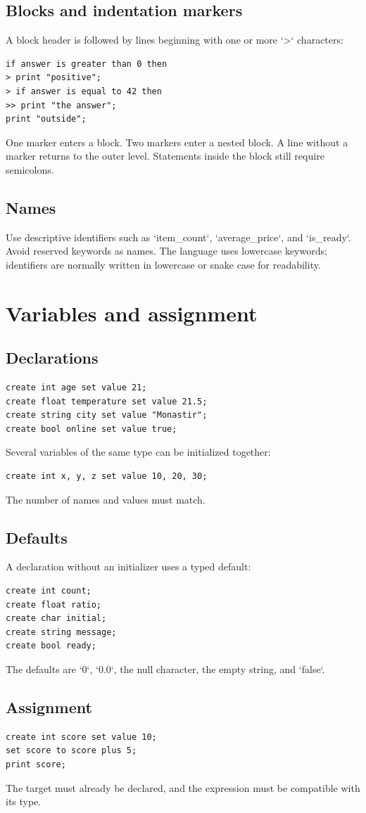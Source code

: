 \documentclass[10.5pt,a4paper]{article}
\begin{document}
\subsection{Blocks and indentation markers}
A block header is followed by lines beginning with one or more `>` characters:
\begin{lstlisting}
if answer is greater than 0 then
> print "positive";
> if answer is equal to 42 then
>> print "the answer";
print "outside";
\end{lstlisting}
One marker enters a block. Two markers enter a nested block. A line without a marker returns to the outer level. Statements inside the block still require semicolons.
\subsection{Names}
Use descriptive identifiers such as `item_count`, `average_price`, and `is_ready`. Avoid reserved keywords as names. The language uses lowercase keywords; identifiers are normally written in lowercase or snake case for readability.
\section{Variables and assignment}
\subsection{Declarations}
\begin{lstlisting}
create int age set value 21;
create float temperature set value 21.5;
create string city set value "Monastir";
create bool online set value true;
\end{lstlisting}
Several variables of the same type can be initialized together:
\begin{lstlisting}
create int x, y, z set value 10, 20, 30;
\end{lstlisting}
The number of names and values must match.
\subsection{Defaults}
A declaration without an initializer uses a typed default:
\begin{lstlisting}
create int count;
create float ratio;
create char initial;
create string message;
create bool ready;
\end{lstlisting}
The defaults are `0`, `0.0`, the null character, the empty string, and `false`.
\subsection{Assignment}
\begin{lstlisting}
create int score set value 10;
set score to score plus 5;
print score;
\end{lstlisting}
The target must already be declared, and the expression must be compatible with its type.
\end{document}
